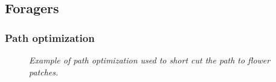 \subsection{Foragers}
	\subsubsection{Path optimization}
		\label{chap:pathOptimization}
		
				\begin{figure}[h]
					\centering
					\caption{\textit{Example of path optimization used to short cut the path to flower patches.}}
					\label{fig:pathOptimization}
				\end{figure}
		

